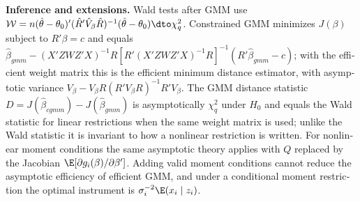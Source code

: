 \begin{english}
\textbf{Inference and extensions.} Wald tests after GMM use $\mathcal W=n(\hat\theta-\theta_0)'(\hat R'\hat V_\beta\hat R)^{-1}(\hat\theta-\theta_0)\dto\chi^2_q$. Constrained GMM minimizes $J(\beta)$ subject to $R'\beta=c$ and equals $\hat\beta_{gmm}-(X'ZWZ'X)^{-1}R[R'(X'ZWZ'X)^{-1}R]^{-1}(R'\hat\beta_{gmm}-c)$; with the efficient weight matrix this is the efficient minimum distance estimator, with asymptotic variance $V_\beta-V_\beta R(R'V_\beta R)^{-1}R'V_\beta$. The GMM distance statistic $D=J(\hat\beta_{cgmm})-J(\hat\beta_{gmm})$ is asymptotically $\chi^2_q$ under $H_0$ and equals the Wald statistic for linear restrictions when the same weight matrix is used; unlike the Wald statistic it is invariant to how a nonlinear restriction is written. For nonlinear moment conditions the same asymptotic theory applies with $Q$ replaced by the Jacobian $\E[\partial g_i(\beta)/\partial\beta']$. Adding valid moment conditions cannot reduce the asymptotic efficiency of efficient GMM, and under a conditional moment restriction the optimal instrument is $\sigma_i^{-2}\E(x_i\mid z_i)$.
\end{english}
